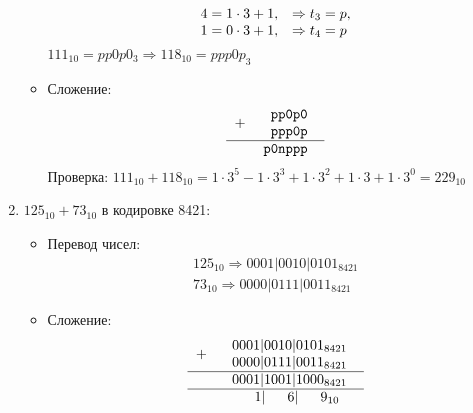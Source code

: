 \documentclass[oneside,a4paper,14pt]{extarticle} %
\begin{document}
\begin{enumerate}
\begin{itemize}
$$\begin{array}[c]{ll}
                                4=1\cdot 3 + 1,    &\Rightarrow t_{3}=p, \\
                                1=0\cdot 3 + 1,     &\Rightarrow t_{4}=p
                            \end{array}
                        $$
                        $111_{10} = pp0p0_{3} \Rightarrow 118_{10} = ppp0p_{3}$
                    \item Сложение:
                        $$
                            \begin{tabular}{{c}{c}}
                                \texttt{$+$ }&
                                \begin{tabular}{c}
                                \texttt{pp0p0}\\
                                \texttt{ppp0p}\\
                                \end{tabular} \\ 
                                \hline
                                & \texttt{p0nppp~}
                            \end{tabular}
                        $$
                    Проверка: $111_{10}+118_{10}= 1\cdot3^5 -1\cdot3^3+1\cdot3^2+1\cdot3+1\cdot3^0 = 229_{10}$
                \end{itemize}
                \pagebreak
            \item $125_{10} + 73_{10}$ в кодировке 8421:
            \begin{itemize}
                \item Перевод чисел:
                    $$
                        \begin{array}{c}
                            125_{10} \Rightarrow 0001|0010|0101_{8421}\\
                            73_{10} \Rightarrow 0000|0111|0011_{8421}
                        \end{array}
                    $$
                \item Сложение:
                    $$
                        \begin{tabular}{{c}{c}}
                            \texttt{$+$ }&
                            \begin{tabular}{c}
                                \texttt{$0001|0010|0101_{8421}$}\\
                                \texttt{$0000|0111|0011_{8421}$}\\
                            \end{tabular}\\
                            \hline
                            & \texttt{$0001|1001|1000_{8421}$}\\
                            \hline
                            & \texttt{$~~1|~~~6|~~~9_{10}$}
                        \end{tabular}
                    $$


\end{itemize}
\end{enumerate}
\end{document}
